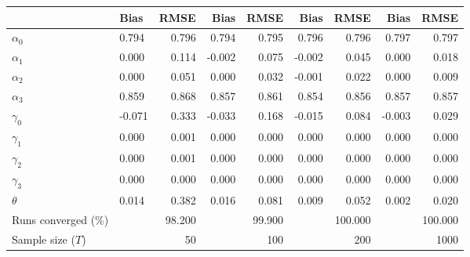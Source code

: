 
\begin{tabular}[t]{llrrrrrrr}
\toprule
  & Bias & RMSE & Bias & RMSE & Bias & RMSE & Bias & RMSE\\
\midrule
$\alpha_{0}$ & 0.794 & 0.796 & 0.794 & 0.795 & 0.796 & 0.796 & 0.797 & 0.797\\
$\alpha_{1}$ & 0.000 & 0.114 & -0.002 & 0.075 & -0.002 & 0.045 & 0.000 & 0.018\\
$\alpha_{2}$ & 0.000 & 0.051 & 0.000 & 0.032 & -0.001 & 0.022 & 0.000 & 0.009\\
$\alpha_{3}$ & 0.859 & 0.868 & 0.857 & 0.861 & 0.854 & 0.856 & 0.857 & 0.857\\
$\gamma_{0}$ & -0.071 & 0.333 & -0.033 & 0.168 & -0.015 & 0.084 & -0.003 & 0.029\\
$\gamma_{1}$ & 0.000 & 0.001 & 0.000 & 0.000 & 0.000 & 0.000 & 0.000 & 0.000\\
$\gamma_{2}$ & 0.000 & 0.001 & 0.000 & 0.000 & 0.000 & 0.000 & 0.000 & 0.000\\
$\gamma_{3}$ & 0.000 & 0.000 & 0.000 & 0.000 & 0.000 & 0.000 & 0.000 & 0.000\\
$\theta$ & 0.014 & 0.382 & 0.016 & 0.081 & 0.009 & 0.052 & 0.002 & 0.020\\
Runs converged (\%) &  & 98.200 &  & 99.900 &  & 100.000 &  & 100.000\\
Sample size ($T$) &  & 50 &  & 100 &  & 200 &  & 1000\\
\bottomrule
\end{tabular}
